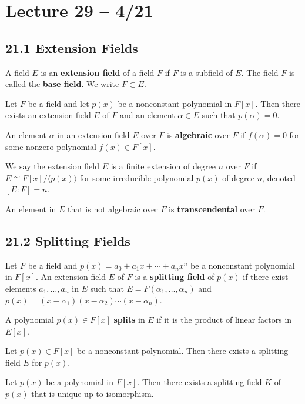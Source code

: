\documentclass{article}
\begin{document}
\section{Lecture 29 -- 4/21}
\subsection{21.1 Extension Fields}
A field $E$ is an \textbf{extension field} of a field $F$ if $F$ is a subfield of $E$. The field $F$ is called the \textbf{base field}. We write $F\subset E$.

\begin{theorem}
  Let $F$ be a field and let $p(x)$ be a nonconstant polynomial in $F[x]$. Then there exists an extension field $E$ of $F$ and an element $\alpha\in E$ such that $p(\alpha)=0$.
\end{theorem}
An element $\alpha$ in an extension field $E$ over $F$ is \textbf{algebraic} over $F$ if $f(\alpha)=0$ for some nonzero polynomial $f(x)\in F[x]$.

We say the extension field $E$ is a finite extension of degree $n$ over $F$ if $E\cong F[x]/\langle p(x)\rangle$ for some irreducible polynomial $p(x)$ of degree $n$, denoted $[E:F]=n$.

An element in $E$ that is not algebraic over $F$ is \textbf{transcendental} over $F$.

\subsection{21.2 Splitting Fields}
\begin{definition}
  Let $F$ be a field and $p(x)=a_0+a_1 x+\cdots+a_nx^n$ be a nonconstant polynomial in $F[x]$. An extension field $E$ of $F$ is a \textbf{splitting field} of $p(x)$ if there exist elements $a_1,\dots,a_n$ in $E$ such that $E=F(\alpha_1,\dots,\alpha_n)$ and $p(x)=(x-\alpha_1)(x-\alpha_2)\cdots(x-\alpha_n)$.
\end{definition}

A polynomial $p(x)\in F[x]$ \textbf{splits} in $E$ if it is the product of linear factors in $E[x]$.

\begin{theorem}
  Let $p(x)\in F[x]$ be a nonconstant polynomial. Then there exists a splitting field $E$ for $p(x)$.
\end{theorem}
\begin{theorem}
  Let $p(x)$ be a polynomial in $F[x]$. Then there exists a splitting field $K$ of $p(x)$ that is unique up to isomorphism.
\end{theorem}
\end{document}
